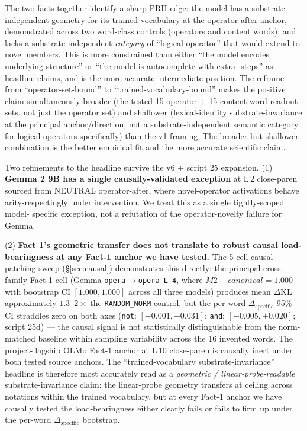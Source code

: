 \documentclass[11pt,letterpaper]{article}
\newcommand{\dkl}{\ensuremath{\Delta\mathrm{KL}}}
\newcommand{\dspec}{\ensuremath{\Delta_{\text{specific}}}}
\newcommand{\Mc}{M2-canonical}
\begin{document}
The two facts together identify a sharp PRH edge: the model has a
substrate-independent geometry for its trained vocabulary at the
operator-after anchor, demonstrated across two word-class controls
(operators and content words); and lacks a substrate-independent
\emph{category} of ``logical operator'' that would extend to novel
members. This is more constrained than either ``the model encodes
underlying structure'' or ``the model is autocomplete-with-extra-
steps'' as headline claims, and is the more accurate intermediate
position. The reframe from ``operator-set-bound'' to
``trained-vocabulary-bound'' makes the positive claim simultaneously
broader (the tested 15-operator + 15-content-word readout sets, not
just the operator set) and shallower (lexical-identity
substrate-invariance at the principal anchor/direction, not a
substrate-independent semantic category for logical operators
specifically) than the v1 framing. The broader-but-shallower
combination is the better empirical fit and the more accurate
scientific claim.

Two refinements to the headline survive the v6 + script 25
expansion. (1) \textbf{Gemma 2 9B has a single causally-validated
exception} at L\,2 close-paren sourced from NEUTRAL operator-after,
where novel-operator activations behave arity-respectingly under
intervention. We treat this as a single tightly-scoped model-
specific exception, not a refutation of the operator-novelty
failure for Gemma.

(2) \textbf{Fact 1's geometric transfer does not
translate to robust causal load-bearingness at any Fact-1 anchor we
have tested.} The 5-cell causal-patching sweep (\S\ref{sec:causal})
demonstrates this directly: the principal cross-family Fact-1 cell
(Gemma \texttt{opera$\to$opera L\,4}, where $\Mc = 1.000$ with
bootstrap CI $[1.000, 1.000]$ across all three models) produces mean
\dkl{} approximately $1.3$--$2\times$ the \texttt{RANDOM\_NORM}
control, but the per-word \dspec{} 95\% CI straddles zero on both
axes (\texttt{not}: $[-0.001, +0.031]$; \texttt{and}:
$[-0.005, +0.020]$; script 25d) --- the causal signal is not
statistically distinguishable from the norm-matched baseline within
sampling variability across the 16 invented words. The
project-flagship OLMo Fact-1 anchor at L\,10 close-paren is causally
inert under both tested source anchors. The ``trained-vocabulary
substrate-invariance'' headline is therefore most accurately read as
a \emph{geometric / linear-probe-readable} substrate-invariance
claim: the linear-probe geometry transfers at ceiling across
notations within the trained vocabulary, but at every Fact-1 anchor
we have causally tested the load-bearingness either clearly fails or
fails to firm up under the per-word \dspec{} bootstrap.
\end{document}
